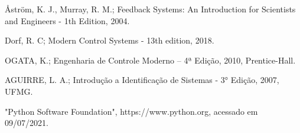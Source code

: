 \documentclass[conference,harvard,brazil,english]{sbatex}
\begin{document}
        Åström, K. J., Murray, R. M.; Feedback Systems: An Introduction for Scientists and Engineers - 1th Edition, 2004. 
        
        Dorf, R. C; Modern Control Systems - 13th edition, 2018.
        
        OGATA, K.; Engenharia de Controle Moderno – 4ª Edição, 2010, Prentice-Hall.
        
        AGUIRRE, L. A.; Introdução a Identificação de Sistemas - 3° Edição, 2007, UFMG.
        
        "Python Software Foundation", https://www.python.org, acessado em 09/07/2021.
        
\end{document}
